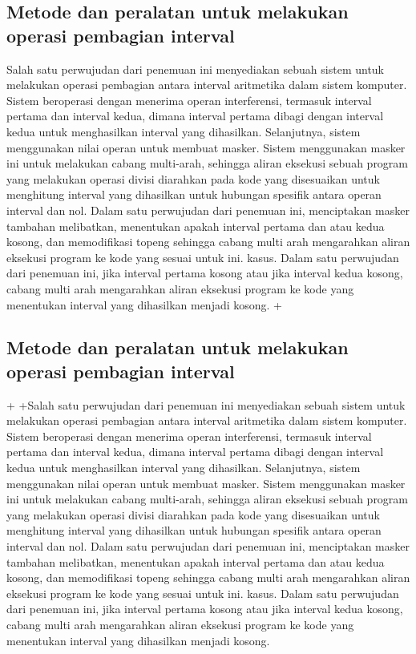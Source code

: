 \subsection{Metode dan peralatan untuk melakukan operasi pembagian interval}

Salah satu perwujudan dari penemuan ini menyediakan sebuah sistem untuk melakukan operasi pembagian antara interval aritmetika dalam sistem komputer. Sistem beroperasi dengan menerima operan interferensi, termasuk interval pertama dan interval kedua, dimana interval pertama dibagi dengan interval kedua untuk menghasilkan interval yang dihasilkan. Selanjutnya, sistem menggunakan nilai operan untuk membuat masker. Sistem menggunakan masker ini untuk melakukan cabang multi-arah, sehingga aliran eksekusi sebuah program yang melakukan operasi divisi diarahkan pada kode yang disesuaikan untuk menghitung interval yang dihasilkan untuk hubungan spesifik antara operan interval dan nol. Dalam satu perwujudan dari penemuan ini, menciptakan masker tambahan melibatkan, menentukan apakah interval pertama dan atau kedua kosong, dan memodifikasi topeng sehingga cabang multi arah mengarahkan aliran eksekusi program ke kode yang sesuai untuk ini. kasus. Dalam satu perwujudan dari penemuan ini, jika interval pertama kosong atau jika interval kedua kosong, cabang multi arah mengarahkan aliran eksekusi program ke kode yang menentukan interval yang dihasilkan menjadi kosong.
+\subsection{Metode dan peralatan untuk melakukan operasi pembagian interval}
+
+Salah satu perwujudan dari penemuan ini menyediakan sebuah sistem untuk melakukan operasi pembagian antara interval aritmetika dalam sistem komputer. Sistem beroperasi dengan menerima operan interferensi, termasuk interval pertama dan interval kedua, dimana interval pertama dibagi dengan interval kedua untuk menghasilkan interval yang dihasilkan. Selanjutnya, sistem menggunakan nilai operan untuk membuat masker. Sistem menggunakan masker ini untuk melakukan cabang multi-arah, sehingga aliran eksekusi sebuah program yang melakukan operasi divisi diarahkan pada kode yang disesuaikan untuk menghitung interval yang dihasilkan untuk hubungan spesifik antara operan interval dan nol. Dalam satu perwujudan dari penemuan ini, menciptakan masker tambahan melibatkan, menentukan apakah interval pertama dan atau kedua kosong, dan memodifikasi topeng sehingga cabang multi arah mengarahkan aliran eksekusi program ke kode yang sesuai untuk ini. kasus. Dalam satu perwujudan dari penemuan ini, jika interval pertama kosong atau jika interval kedua kosong, cabang multi arah mengarahkan aliran eksekusi program ke kode yang menentukan interval yang dihasilkan menjadi kosong.
